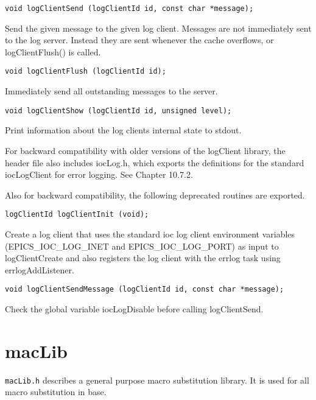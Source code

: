 \begin{verbatim}void logClientSend (logClientId id, const char *message);
\end{verbatim}Send the given message to the given log client. Messages are not immediately sent to the log server. Instead they are sent 
whenever the cache overflows, or logClientFlush() is called.

\begin{verbatim}void logClientFlush (logClientId id);
\end{verbatim}    Immediately send all outstanding messages to the server.

\begin{verbatim}void logClientShow (logClientId id, unsigned level);
\end{verbatim}    Print information about the log clients internal state to stdout.

For backward compatibility with older versions of the logClient library, the header file also includes iocLog.h, which 
exports the definitions for the standard iocLogClient for error logging. See Chapter 10.7.2.

Also for backward compatibility, the following deprecated routines are exported.

\begin{verbatim}logClientId logClientInit (void);
\end{verbatim}   Create a log client that uses the standard ioc log client environment variables (EPICS\_IOC\_LOG\_INET and 
EPICS\_IOC\_LOG\_PORT) as input to logClientCreate and also registers the log client with the errlog task using 
errlogAddListener.

\begin{verbatim}void logClientSendMessage (logClientId id, const char *message);
\end{verbatim}    Check the global variable iocLogDisable before calling logClientSend.

\section{macLib}

\verb|macLib.h| describes a general purpose macro substitution library. It is used for all macro substitution in base.


